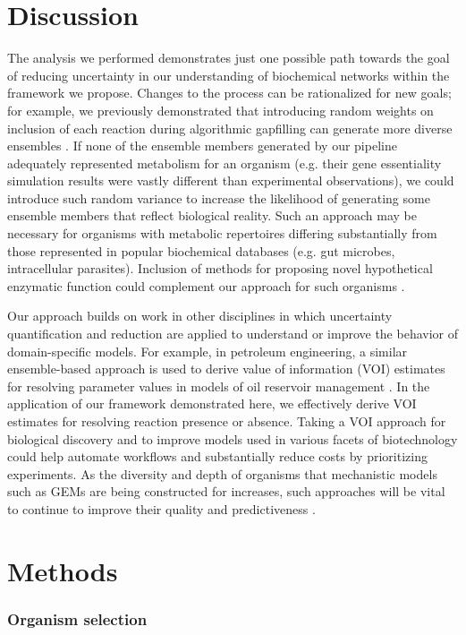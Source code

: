 \documentclass[11pt,onecolumn,notitlepage,openany,twoside]{book}
\begin{document}
\begin{refsection}
\section{Discussion}

The analysis we performed demonstrates just one possible path towards the goal of reducing uncertainty in our understanding of biochemical networks within the framework we propose. Changes to the process can be rationalized for new goals; for example, we previously demonstrated that introducing random weights on inclusion of each reaction during algorithmic gapfilling can generate more diverse ensembles \cite{Biggs2017-md}. If none of the ensemble members generated by our pipeline adequately represented metabolism for an organism (e.g. their gene essentiality simulation results were vastly different than experimental observations), we could introduce such random variance to increase the likelihood of generating some ensemble members that reflect biological reality. Such an approach may be necessary for organisms with metabolic repertoires differing substantially from those represented in popular biochemical databases (e.g. gut microbes, intracellular parasites). Inclusion of methods for proposing novel hypothetical enzymatic function could complement our approach for such organisms \cite{Hatzimanikatis2005-wy,Jeffryes2015-bm}.

Our approach builds on work in other disciplines in which uncertainty quantification and reduction are applied to understand or improve the behavior of domain-specific models. For example, in petroleum engineering, a similar ensemble-based approach is used to derive value of information (VOI) estimates for resolving parameter values in models of oil reservoir management \cite{He2018-nb}. In the application of our framework demonstrated here, we effectively derive VOI estimates for resolving reaction presence or absence. Taking a VOI approach for biological discovery and to improve models used in various facets of biotechnology could help automate workflows and substantially reduce costs by prioritizing experiments. As the diversity and depth of organisms that mechanistic models such as GEMs are being constructed for increases, such approaches will be vital to continue to improve their quality and predictiveness \cite{Magnusdottir2017-dk,Monk2014-fa}.

\section{Methods}
\subsubsection{Organism selection}


\end{refsection}
\end{document}
